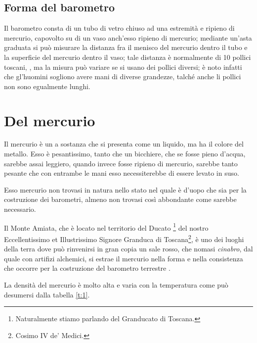 \documentclass[%
    corpo=11pt,
    twoside,
    oldstyle,
    tipotesi=magistrale,
    greek,
    evenboxes,
]{toptesi}
\begin{document}
{\subsection{Forma del barometro}
Il barometro consta di un tubo di vetro chiuso ad una estremit\`a e
ripieno di mercurio, capovolto su di un vaso anch'esso ripieno di
mercurio; mediante un'asta graduata si pu\`o misurare la distanza fra
il menisco del mercurio dentro il tubo e la superficie del mercurio
dentro il vaso; tale distanza \`e normalmente di 10 pollici toscani,
\cite{tor1,tor2}, ma la misura pu\`o variare se si usano dei pollici
diversi; \`e noto infatti che gl'huomini sogliono avere mani di
diverse grandezze, talch\'e anche li pollici non sono egualmente
lunghi.
\section{Del mercurio}
Il mercurio \`e un a sostanza che si presenta come un liquido, ma ha il colore
del metallo. Esso \`e pesantissimo, tanto che un bicchiere, che se fosse pieno
d'acqua, sarebbe assai leggiero, quando invece fosse ripieno di mercurio,
sarebbe tanto pesante che con entrambe le mani esso necessiterebbe di essere
levato in suso.

Esso mercurio non trovasi in natura nello stato nel quale \`e d'uopo che sia
per la costruzione dei barometri, almeno non trovasi cos\`i abbondante come
sarebbe necessario.

\setcounter{footnote}{25}

Il Monte Amiata, che \`e locato nel territorio del Ducato%
\footnote{Naturalmente stiamo parlando del Granducato di Toscana.%
\ifclassica\NoteWhiteLine\fi
} del nostro Eccellentissimo et Illustrissimo Signore Granduca di Toscana\footnote{Cosimo IV de' Medici.}, \`e uno dei
luoghi della terra dove pu\`o rinvenirsi in gran copia un sale rosso, che
nomasi \emph{cinabro}, dal quale con artifizi alchemici, si estrae il mercurio
nella forma e nella consistenza che occorre per la costruzione del barometro
terrestre%
\ifclassica
{}\fi.


La densit\`a del mercurio \`e molto alta e varia con la temperatura come
pu\`o desumersi dalla tabella \ref{t:1}.


}
\end{document}
